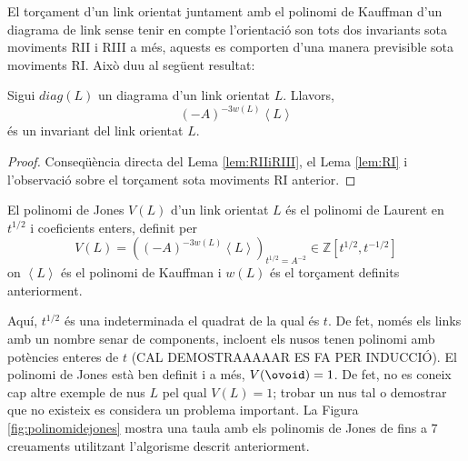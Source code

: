 El torçament d'un link orientat juntament amb el polinomi de Kauffman d'un diagrama de link sense tenir en compte l'orientació son tots dos invariants sota moviments RII i RIII a més, aquests es comporten d'una manera previsible sota moviments RI. Això duu al següent resultat:

\begin{theorem}
	Sigui $diag(L)$ un diagrama d'un link orientat $L$. Llavors, $$(-A)^{-3w(L)}\left\langle L\right\rangle$$ és un invariant del link orientat $L$.
\end{theorem}

\begin{proof}
	Conseqüència directa del Lema \ref{lem:RIIiRIII}, el Lema \ref{lem:RI} i l'observació sobre el torçament sota moviments RI anterior.
\end{proof}

\begin{definition}\label{def:polinomidejones}
	El polinomi de Jones $V(L)$ d'un link orientat $L$ és el polinomi de Laurent en $t^{1/2}$ i coeficients enters, definit per $$V(L)=\left((-A)^{-3w(L)}\left\langle L\right\rangle\right)_{t^{1/2}=A^{-2}}\in\mathbb{Z}[t^{1/2},t^{-1/2}]$$ on $\left\langle L\right\rangle$ és el polinomi de Kauffman i $w(L)$ és el torçament definits anteriorment.
\end{definition}

Aquí, $t^{1/2}$ és una indeterminada el quadrat de la qual és $t$. De fet, només els links amb un nombre senar de components, incloent els nusos tenen polinomi amb potències enteres de $t$ (CAL DEMOSTRAAAAAR ES FA PER INDUCCIÓ). El polinomi de Jones està ben definit i a més, $V(\ovoid)=1$. De fet, no es coneix cap altre exemple de nus $L$ pel qual $V(L)=1$; trobar un nus tal o demostrar que no existeix es considera un problema important. La Figura \ref{fig:polinomidejones} mostra una taula amb els polinomis de Jones de fins a 7 creuaments utilitzant l'algorisme descrit anteriorment.\\

